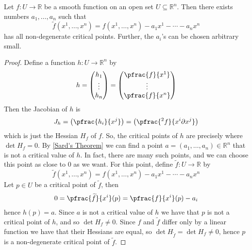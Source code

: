 \begin{prop}
\label{existence of Morse functions on R^n}
Let $f : U \rightarrow \mathbb R$ be a smooth function on an open set $U \subseteq \mathbb R^n$. Then there exists numbers $a_1,\ldots,a_n$ such that 
\[ \widetilde f(x^1,\ldots,x^n) = f(x^1,\ldots,x^n) - a_1x^1 - \cdots - a_nx^n \]
has all non-degenerate critical points. Further, the $a_i$'s can be chosen arbitrary small.
\end{prop}
\begin{proof}
Define a function $h : U \rightarrow \mathbb R^n$ by
\[ h = \begin{pmatrix} h_1 \\ \vdots \\ h_n \end{pmatrix} = \begin{pmatrix} \pfrac{f}{x^1} \\ \vdots \\ \pfrac{f}{x^n} \end{pmatrix} \]
Then the Jacobian of $h$ is 
\[ J_h = \left( \pfrac{h_i}{x^j} \right) = \left( \pfrac{^2 f}{x^i \partial x^j} \right) \]
which is just the Hessian $H_f$ of $f$. So, the critical points of $h$ are precisely where $\det H_f = 0$. By \cref{Sard's Theorem} we can find a point $a = (a_1,\ldots,a_n) \in \mathbb R^n$ that is not a critical value of $h$. In fact, there are many such points, and we can choose this point as close to 0 as we want. For this point, define $\widetilde f : U \rightarrow \mathbb R$ by
\[ \widetilde f(x^1,\ldots,x^n) = f(x^1,\ldots,x^n) - a_1x^1- \cdots - a_nx^n \]
Let $p \in U$ be a critical point of $\widetilde f$, then
\[ 0 = \pfrac{\widetilde f}{x^i}(p) = \pfrac{f}{x^i}(p) - a_i \]
hence $h(p) = a$. Since $a$ is not a critical value of $h$ we have that $p$ is not a critical point of $h$, and so $\det H_f \neq 0$. Since $f$ and $\widetilde f$ differ only by a linear function we have that their Hessians are equal, so $\det H_{\widetilde f} = \det H_f \neq 0$, hence $p$ is a non-degenerate critical point of $\widetilde f$.
\end{proof}

